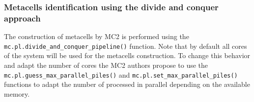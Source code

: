\documentclass[
]{book}
\begin{document}
\hypertarget{metacells-identification-using-the-divide-and-conquer-approach}{%
\subsubsection*{Metacells identification using the divide and conquer approach}\label{metacells-identification-using-the-divide-and-conquer-approach}}

The construction of metacells by MC2 is performed using the \texttt{mc.pl.divide\_and\_conquer\_pipeline()} function.
Note that by default all cores of the system will be used for the metacells construction.
To change this behavior and adapt the number of cores the MC2 authors propose to use the \texttt{mc.pl.guess\_max\_parallel\_piles()} and \texttt{mc.pl.set\_max\_parallel\_piles()} functions to adapt the number of processed in parallel depending on the available memory.
\end{document}

